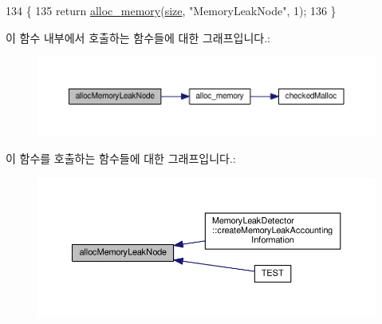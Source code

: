\begin{DoxyCode}
134 \{
135     \textcolor{keywordflow}{return} \hyperlink{class_test_memory_allocator_a2ebbde51a1d514c74e9e2a09a21b0624}{alloc\_memory}(\hyperlink{gst__avb__playbin_8c_a439227feff9d7f55384e8780cfc2eb82}{size}, \textcolor{stringliteral}{"MemoryLeakNode"}, 1);
136 \}
\end{DoxyCode}


이 함수 내부에서 호출하는 함수들에 대한 그래프입니다.\+:
\nopagebreak
\begin{figure}[H]
\begin{center}
\leavevmode
\includegraphics[width=350pt]{class_test_memory_allocator_a1a786ad58b46528e82235a14fa667c1d_cgraph}
\end{center}
\end{figure}




이 함수를 호출하는 함수들에 대한 그래프입니다.\+:
\nopagebreak
\begin{figure}[H]
\begin{center}
\leavevmode
\includegraphics[width=350pt]{class_test_memory_allocator_a1a786ad58b46528e82235a14fa667c1d_icgraph}
\end{center}
\end{figure}



